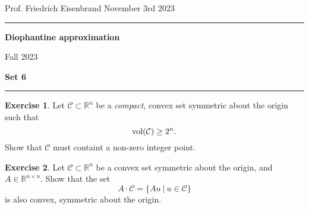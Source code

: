 \documentclass[12pt,a4paper]{article}
\date{}
\theoremstyle{plain}
\newtheorem*{Sol*}{Solution}
\theoremstyle{definition}
\newtheorem{Ex}{Exercise}
\def \R {\mathbb R}
\newcommand{\df}{\mathrel{\mathop:}=}
\newif\ifsolutions
\newcommand{\exercise}[2]{
			\begin{Ex} #1 \end{Ex}
			\ifsolutions  \begin{Sol*} #2 \end{Sol*} \bigskip \else \bigskip  \fi
		}
\begin{document}
\begin{center}
{Prof. Friedrich Eisenbrand \hfill November 3rd 2023}
\end{center}
	
\hrule\vspace{\baselineskip}

\begin{center}
\textbf{Diophantine approximation}

Fall 2023

\bigskip

\textbf{Set 6}
\ifsolutions{\textbf{- Solutions}} \else{} \fi
\end{center}

\hrule\vspace{\baselineskip}




\exercise{
	Let $\mathcal{C} \subset \R^n$ be a \emph{compact}, convex set symmetric about the origin such that
		\[ {\rm vol}(\mathcal{C}) \geq 2^n.\]
	Show that $\mathcal{C}$ must containt a non-zero integer point.
}
{
	Consider the sequence of nested sets $S_k \df (1+\frac1k) \mathcal{C} \subseteq  2 \mathcal{C}$ for $k \geq 1$.
	
	Since ${\rm vol}(S_k) > 2^n$, Minkowski's theorem holds: there exists at least one non-zero integer point in each $S_k$, $k\geq1$.

	As $2 \mathcal{C}$ is bounded, the sequence is uniformly bounded. 
	Therefore, there must exist a non-zero integer point $p$ belonging in infinitely many sets $S_k$.
	As such, $p$ must belong, in the limit, in the closure $\overline{\mathcal{C}} = \mathcal{C}$.
}

\exercise{
	Let $\mathcal{C} \subset \R^n$ be a convex set symmetric about the origin, and $A \in \R^{n \times n}$.
	Show that the set
		\[ A \cdot \mathcal{C} = \{ A u \ | \ u \in \mathcal{C} \} \]
	is also convex, symmetric about the origin.
}
{}
\end{document}
